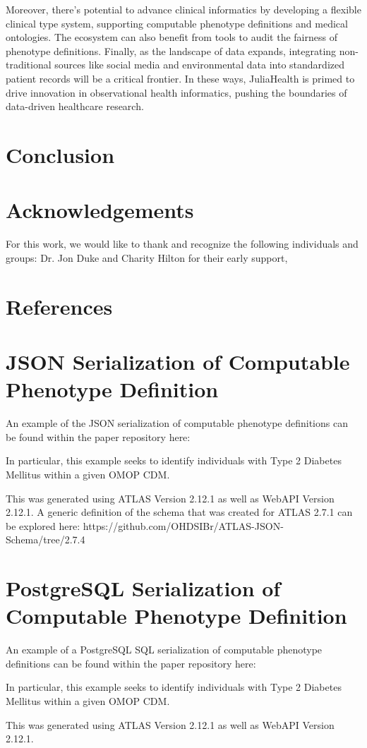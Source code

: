 \documentclass{juliacon}
\begin{document}
Moreover, there's potential to advance clinical informatics by developing a flexible clinical type system, supporting computable phenotype definitions and medical ontologies. The ecosystem can also benefit from tools to audit the fairness of phenotype definitions. Finally, as the landscape of data expands, integrating non-traditional sources like social media and environmental data into standardized patient records will be a critical frontier. In these ways, JuliaHealth is primed to drive innovation in observational health informatics, pushing the boundaries of data-driven healthcare research.


\section{Conclusion}



\section{Acknowledgements}

For this work, we would like to thank and recognize the following individuals and groups: Dr. Jon Duke and Charity Hilton for their early support, 

\section{References}

\appendix

\section{JSON Serialization of Computable Phenotype Definition}\label{appendix:json}

An example of the JSON serialization of computable phenotype definitions can be found within the paper repository here:

In particular, this example seeks to identify individuals with Type 2 Diabetes Mellitus within a given OMOP CDM.

This was generated using ATLAS Version 2.12.1 as well as 
WebAPI Version 2.12.1.
A generic definition of the schema that was created for ATLAS 2.7.1 can be explored here: https://github.com/OHDSIBr/ATLAS-JSON-Schema/tree/2.7.4

\section{PostgreSQL Serialization of Computable Phenotype Definition}\label{appendix:postgresql}

An example of a PostgreSQL SQL serialization of computable phenotype definitions can be found within the paper repository here:

In particular, this example seeks to identify individuals with Type 2 Diabetes Mellitus within a given OMOP CDM.

This was generated using ATLAS Version 2.12.1 as well as 
WebAPI Version 2.12.1.


\end{document}
